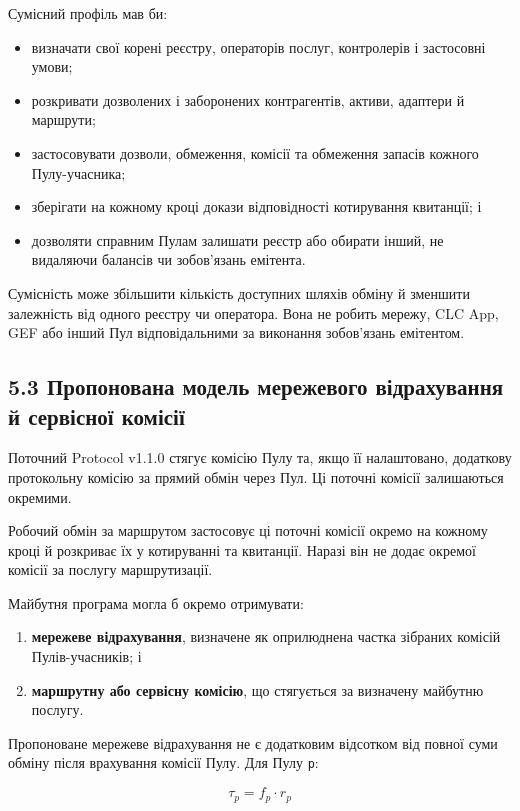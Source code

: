\documentclass[11pt]{article}
\begin{document}
Сумісний профіль мав би:

\begin{itemize}[leftmargin=*]
\item визначати свої корені реєстру, операторів послуг, контролерів і застосовні умови;
\item розкривати дозволених і заборонених контрагентів, активи, адаптери й маршрути;
\item застосовувати дозволи, обмеження, комісії та обмеження запасів кожного Пулу-учасника;
\item зберігати на кожному кроці докази відповідності котирування квитанції; і
\item дозволяти справним Пулам залишати реєстр або обирати інший, не видаляючи балансів чи зобов'язань емітента.
\end{itemize}
Сумісність може збільшити кількість доступних шляхів обміну й зменшити залежність від одного реєстру чи оператора. Вона не робить мережу, CLC App, GEF або інший Пул відповідальними за виконання зобов'язань емітентом.

\subsection*{5.3 Пропонована модель мережевого відрахування й сервісної комісії}

Поточний Protocol v1.1.0 стягує комісію Пулу та, якщо її налаштовано, додаткову протокольну комісію за прямий обмін через Пул. Ці поточні комісії залишаються окремими.

Робочий обмін за маршрутом застосовує ці поточні комісії окремо на кожному кроці й розкриває їх у котируванні та квитанції. Наразі він не додає окремої комісії за послугу маршрутизації.

Майбутня програма могла б окремо отримувати:

\begin{enumerate}[leftmargin=*]
\item \textbf{мережеве відрахування}, визначене як оприлюднена частка зібраних комісій Пулів-учасників; і
\item \textbf{маршрутну або сервісну комісію}, що стягується за визначену майбутню послугу.
\end{enumerate}
Пропоноване мережеве відрахування не є додатковим відсотком від повної суми обміну після врахування комісії Пулу. Для Пулу \texttt{p}:

\[
\tau_p = f_p \cdot r_p
\]
\end{document}
